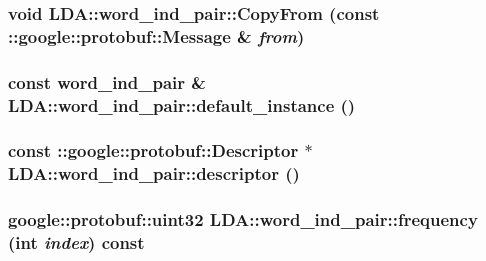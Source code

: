 \label{class_l_d_a_1_1word__ind__pair_a7e0a5922b46cdcfc25b8679347c24450}
\hypertarget{class_l_d_a_1_1word__ind__pair_a39142475defcc6cbc10f317fa658b423}{
\subsubsection[{CopyFrom}]{\setlength{\rightskip}{0pt plus 5cm}void LDA::word\_\-ind\_\-pair::CopyFrom (const ::google::protobuf::Message \& {\em from})}}
\label{class_l_d_a_1_1word__ind__pair_a39142475defcc6cbc10f317fa658b423}
\hypertarget{class_l_d_a_1_1word__ind__pair_aa3672a98d52d81e3de61486dfd22aadb}{
\subsubsection[{default\_\-instance}]{\setlength{\rightskip}{0pt plus 5cm}const {\bf word\_\-ind\_\-pair} \& LDA::word\_\-ind\_\-pair::default\_\-instance ()}}
\label{class_l_d_a_1_1word__ind__pair_aa3672a98d52d81e3de61486dfd22aadb}
\hypertarget{class_l_d_a_1_1word__ind__pair_a78a2ee5b1469b4ffd50c6df6f7994dea}{
\subsubsection[{descriptor}]{\setlength{\rightskip}{0pt plus 5cm}const ::google::protobuf::Descriptor $\ast$ LDA::word\_\-ind\_\-pair::descriptor ()}}
\label{class_l_d_a_1_1word__ind__pair_a78a2ee5b1469b4ffd50c6df6f7994dea}
\hypertarget{class_l_d_a_1_1word__ind__pair_a6c44dbd24bf839caf7d8bdcc6a665437}{
\subsubsection[{frequency}]{\setlength{\rightskip}{0pt plus 5cm}google::protobuf::uint32 LDA::word\_\-ind\_\-pair::frequency (int {\em index}) const}}
